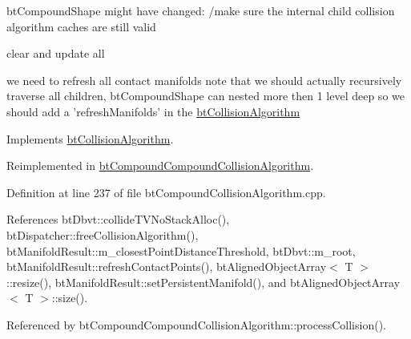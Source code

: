 btCompoundShape might have changed: /make sure the internal child collision algorithm caches are still valid

clear and update all

we need to refresh all contact manifolds note that we should actually recursively traverse all children, btCompoundShape can nested more then 1 level deep so we should add a 'refreshManifolds' in the \hyperlink{classbt_collision_algorithm}{btCollisionAlgorithm} 

Implements \hyperlink{classbt_collision_algorithm}{btCollisionAlgorithm}.

Reimplemented in \hyperlink{classbt_compound_compound_collision_algorithm_5fb9d60f9713c0e3795c89390353beb3}{btCompoundCompoundCollisionAlgorithm}.

Definition at line 237 of file btCompoundCollisionAlgorithm.cpp.

References btDbvt::collideTVNoStackAlloc(), btDispatcher::freeCollisionAlgorithm(), btManifoldResult::m\_\-closestPointDistanceThreshold, btDbvt::m\_\-root, btManifoldResult::refreshContactPoints(), btAlignedObjectArray$<$ T $>$::resize(), btManifoldResult::setPersistentManifold(), and btAlignedObjectArray$<$ T $>$::size().

Referenced by btCompoundCompoundCollisionAlgorithm::processCollision().

